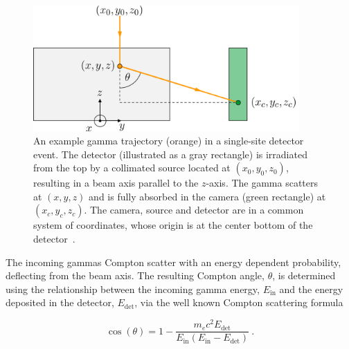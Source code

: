 \begin{figure}[!tbh]
    \centering
    \includegraphics[width=4in]{figs/scanner/WorkingPrinciple_labeled_width_4in.png}
    \caption{An example gamma trajectory (orange) in a single-site detector event. The detector (illustrated as a gray rectangle) is irradiated from the top by a collimated source located at $(x_0, y_0, z_0)$, resulting in a beam axis parallel to the $z$-axis. The gamma scatters at $(x,y,z)$ and is fully absorbed in the camera (green rectangle) at $(x_c, y_c, z_c)$. The camera, source and detector are in a common system of coordinates, whose origin is at the center bottom of the detector~\cite{compton_scanner}.}
    \label{fig:workingprinciple}
\end{figure}

The incoming gammas Compton scatter with an energy dependent probability, deflecting from the beam axis. The resulting Compton angle, $\theta$, is determined using the relationship between the incoming gamma energy, $E_\text{in}$ and the energy deposited in the detector, $E_\text{det}$, via the well known Compton scattering formula~\cite{compton}   

\begin{equation} \label{eq:compton}
    \cos(\theta) = 1 - \dfrac{m_ec^2 E_\text{det}}{E_\text{in} \left(E_\text{in} - E_\text{det}\right)}~.
\end{equation}

